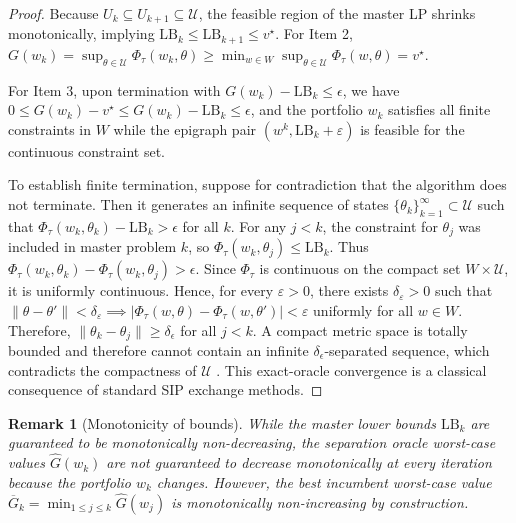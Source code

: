 \documentclass[11pt, a4paper]{article}
\newtheorem{remark}{Remark}
\begin{document}
\begin{proof}
Because $U_k \subseteq U_{k+1} \subseteq \mathcal{U}$, the feasible region of the master LP shrinks monotonically, implying $\text{LB}_k \le \text{LB}_{k+1} \le v^\star$. For Item 2, $G(w_k) = \sup_{\theta \in \mathcal{U}} \Phi_\tau(w_k, \theta) \ge \min_{w \in W} \sup_{\theta \in \mathcal{U}} \Phi_\tau(w, \theta) = v^\star$.

For Item 3, upon termination with $G(w_k) - \text{LB}_k \le \epsilon$, we have $0 \le G(w_k) - v^\star \le G(w_k) - \text{LB}_k \le \epsilon$, and the portfolio $w_k$ satisfies all finite constraints in $W$ while the epigraph pair $(w^k, \text{LB}_k+\varepsilon)$ is feasible for the continuous constraint set.

To establish finite termination, suppose for contradiction that the algorithm does not terminate. Then it generates an infinite sequence of states $\{\theta_k\}_{k=1}^\infty \subset \mathcal{U}$ such that $\Phi_\tau(w_k, \theta_k) - \text{LB}_k > \epsilon$ for all $k$. For any $j < k$, the constraint for $\theta_j$ was included in master problem $k$, so $\Phi_\tau(w_k, \theta_j) \le \text{LB}_k$. Thus $\Phi_\tau(w_k, \theta_k) - \Phi_\tau(w_k, \theta_j) > \epsilon$. Since $\Phi_\tau$ is continuous on the compact set $W\times \mathcal{U}$, it is uniformly continuous. Hence, for every $\varepsilon>0$, there exists $\delta_\varepsilon>0$ such that $\|\theta-\theta'\|<\delta_\varepsilon \implies |\Phi_\tau(w,\theta)-\Phi_\tau(w,\theta')|<\varepsilon$ uniformly for all $w\in W$. Therefore, $\|\theta_k - \theta_j\| \ge \delta_\epsilon$ for all $j < k$. A compact metric space is totally bounded and therefore cannot contain an infinite $\delta_\epsilon$-separated sequence, which contradicts the compactness of $\mathcal{U}$ \citep{hettich1993semi, lopez2007semi}. This exact-oracle convergence is a classical consequence of standard SIP exchange methods.
\end{proof}

\begin{remark}[Monotonicity of bounds]
While the master lower bounds $\text{LB}_k$ are guaranteed to be monotonically non-decreasing, the separation oracle worst-case values $\widehat{G}(w_k)$ are not guaranteed to decrease monotonically at every iteration because the portfolio $w_k$ changes. However, the best incumbent worst-case value $\overline{G}_k = \min_{1 \le j \le k} \widehat{G}(w_j)$ is monotonically non-increasing by construction.
\end{remark}
\end{document}
